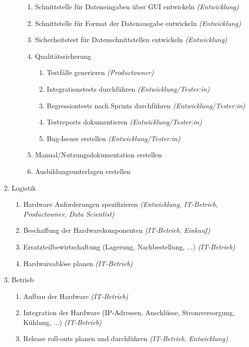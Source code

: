 \begin{enumerate}
\begin{enumerate}
\begin{enumerate}
					\item Schnittstelle für Dateneingaben über GUI entwickeln \colorbox{hellrot}{\textit{(Entwicklung)}}
					\item Schnittstelle für Format der Datenausgabe entwickeln \colorbox{hellrot}{\textit{(Entwicklung)}}
					\item Sicherheitstest für Datenschnittstellen entwickeln \colorbox{hellrot}{\textit{(Entwicklung)}}
					\item Qualitätssicherung 
						\begin{enumerate}
							\item Testfälle generieren \colorbox{hellrot}{\textit{(Productowner)}}
							\item Integrationstests durchführen \textit{(Entwicklung/Tester:in)}
							\item Regressiontests nach Sprints durchführen \textit{(Entwicklung/Tester:in)}
							\item Testreports dokumentieren \textit{(Entwicklung/Tester:in)}
							\item Bug-Issues erstellen \textit{(Entwicklung/Tester:in)}
						\end{enumerate}
					\item Manual/Nutzungsdokumentation erstellen
					\item Ausbildungsunterlagen erstellen
				\end{enumerate}
		\end{enumerate}
	\item Logistik
		\begin{enumerate}
			\item Hardware Anforderungen spezifizieren \textit{(Entwicklung, IT-Betrieb, Productowner, Data Scientist)}
			\item Beschaffung der Hardwarekomponenten \textit{(IT-Betrieb, Einkauf)}
			\item Ersatzteilbewirtschaftung (Lagerung, Nachbestellung, ...) \textit{(IT-Betrieb)}
			\item Hardwareablöse planen \textit{(IT-Betrieb)}
		\end{enumerate}	
	\item Betrieb 
		\begin{enumerate}
			\item Aufbau der Hardware \textit{(IT-Betrieb)}
			\item Integration der Hardware (IP-Adressen, Anschlüsse, Stromversorgung, Kühlung, ...) \textit{(IT-Betrieb)}
			\item Release roll-outs planen und durchführen \textit{(IT-Betrieb, Entwicklung)}

\end{enumerate}
\end{enumerate}

